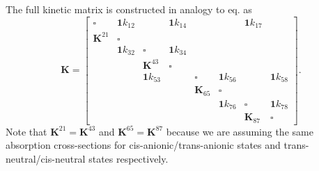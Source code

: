 \documentclass{article}
\begin{document}
The full kinetic matrix is constructed in analogy to eq.  as
\begin{equation}\label{eq:K_8states}
    \mathbf{K} = 
    \begin{bmatrix}
    \square & \mathbf{1}k_{12} &  & \mathbf{1}k_{14} & & & \mathbf{1}k_{17}  \\
    \mathbf{K}^{21} & \square \\
    & \mathbf{1}k_{32} & \square  & \mathbf{1}k_{34} \\
    & & \mathbf{K}^{43}  & \square \\
    & & \mathbf{1}k_{53} &  &  \square & \mathbf{1}k_{56} & & \mathbf{1}k_{58} \\
    & & & & \mathbf{K}_{65} & \square \\
    & & & & & \mathbf{1}k_{76} & \square & \mathbf{1}k_{78} \\
    & & & & & & \mathbf{K}_{87} & \square 
    \end{bmatrix}.
\end{equation}
Note that $\mathbf{K}^{21} =  \mathbf{K}^{43}$ and $\mathbf{K}^{65} =  \mathbf{K}^{87}$ because we are assuming the same absorption cross-sections for cis-anionic/trans-anionic states and trans-neutral/cis-neutral states respectively.

\end{document}

